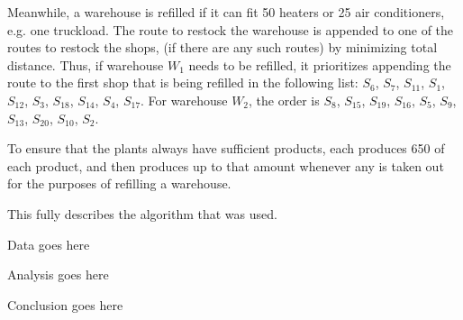 \begin{paper}
Meanwhile, a warehouse is refilled if it can fit 50 heaters or 25 air conditioners, e.g. one truckload.
The route to restock the warehouse is appended to one of the routes to restock the shops, (if there are any such routes) by minimizing total distance.
Thus, if warehouse $W_1$ needs to be refilled, it prioritizes appending the route to the first shop that is being refilled in the following list: $S_6$, $S_7$, $S_{11}$, $S_1$, $S_{12}$, $S_3$, $S_{18}$, $S_{14}$, $S_4$, $S_{17}$.
For warehouse $W_2$, the order is $S_8$, $S_{15}$, $S_{19}$, $S_{16}$, $S_5$, $S_9$, $S_{13}$, $S_{20}$, $S_{10}$, $S_2$.

To ensure that the plants always have sufficient products, each produces 650 of each product, and then produces up to that amount whenever any is taken out for the purposes of refilling a warehouse.

This fully describes the algorithm that was used.


Data goes here


Analysis goes here


Conclusion goes here

\end{paper}

